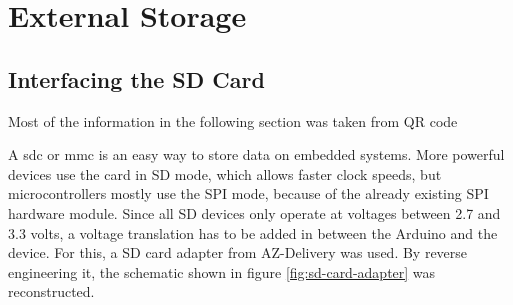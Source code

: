 \setchapterpreamble[u]{\margintoc}

\chapter{External Storage}

\section{Interfacing the SD Card}
\label{sec:interfacing-the-sd-card}

Most of the information in the following section was taken from QR code 

A \gls{sdc} or \gls{mmc} is an easy way to store data on embedded systems. More powerful devices use the card in SD mode, which allows faster clock speeds, but microcontrollers mostly use the SPI mode, because of the already existing SPI hardware module. Since all SD devices only operate at voltages between 2.7 and 3.3 volts, a voltage translation has to be added in between the Arduino and the device. For this, a SD card adapter from AZ-Delivery was used. By reverse engineering it, the schematic shown in figure \ref{fig:sd-card-adapter} was reconstructed.

